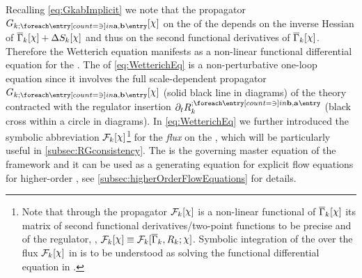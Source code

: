 Recalling \cref{eq:GkabImplicit} we note that the propagator $\FSpropagator{\FSidx{a},\FSidx{b}}[\FSsf]$ on the \rhs{} of the \frgEquation{} depends on the inverse Hessian of $\FSeaa_k[\FSsf]+\Delta S_k[\FSsf]$ and thus on the second functional derivatives of $\FSeaa_k[\FSsf]$.
Therefore the Wetterich equation manifests as a non-linear functional differential equation for the \eaa{}.
The \rhs{} of \cref{eq:WetterichEq} is a non-perturbative one-loop equation since it involves the full scale-dependent propagator $\FSpropagator{\FSidx{a},\FSidx{b}}[\FSsf]$ (solid black line in diagrams) of the theory contracted with the regulator insertion $\FSregulatorDt{\FSidx{b},\FSidx{a}}$ (black cross within a circle in diagrams).
In \cref{eq:WetterichEq} we further introduced the symbolic abbreviation $\FRGflow_k[\FSsf]$\footnote{%
	Note that through the propagator $\FRGflow_k[\FSsf]$ is a non-linear functional of $\FSeaa_k[\FSsf]$ \dash{} its matrix of second functional derivatives/two-point functions to be precise \dash{} and of the regulator, \ie{}, $\FRGflow_k[\FSsf]\equiv\FRGflow_k[\FSeaa_k,R_k;\FSsf]$.
	Symbolic integration of the \frgEquation{} over the \frg{} flux $\FRGflow_k[\FSsf]$ in \rgtime{} is to be understood as solving the functional differential equation in \rgtime{}.%
} for the \textit{\frg{} flux} on the \rhs{}, which will be particularly useful in \cref{subsec:RGconsistency}.
The \frgEquation{} is the governing master equation of the \frg{} framework and it can be used as a generating equation for explicit flow equations for higher-order \nptFunctions{}, see \cref{subsec:higherOrderFlowEquations} for details.

